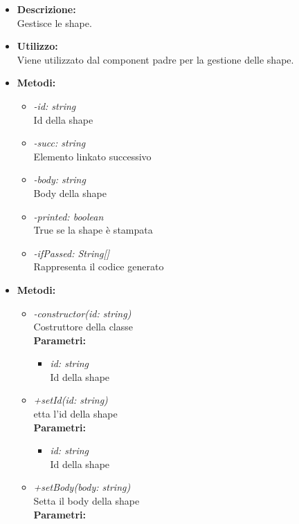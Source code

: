 \begin{itemize}
	\item \textbf{Descrizione:}\\
	Gestisce le shape.
	\item \textbf{Utilizzo:}\\
	Viene utilizzato dal component padre per la gestione delle shape.
	\item \textbf{Metodi:}
		\begin{itemize}
			\item \emph{-id: string}\\
    		Id della shape
    		\item \emph{-succ: string}\\
    		Elemento linkato successivo
    		\item \emph{-body: string}\\
    		Body della shape
    		\item \emph{-printed: boolean}\\
    		True se la shape è stampata
    		\item \emph{-ifPassed: String[]}\\
    		Rappresenta il codice generato
		\end{itemize}
	\item \textbf{Metodi:}
		\begin{itemize}
			\item \emph{-constructor(id: string)}\\
    		Costruttore della classe\\
    		\textbf{Parametri:}
    		\begin{itemize}
    			\item \emph{id: string}\\
    			Id della shape
    		\end{itemize}
    		\item \emph{+setId(id: string)}\\
    		etta l'id della shape\\
    		\textbf{Parametri:}
    		\begin{itemize}
    			\item \emph{id: string}\\
    			Id della shape
    		\end{itemize}
    		\item \emph{+setBody(body: string)}\\
    		Setta il body della shape\\
    		\textbf{Parametri:}
    		\begin{itemize}

\end{itemize}
\end{itemize}
\end{itemize}
